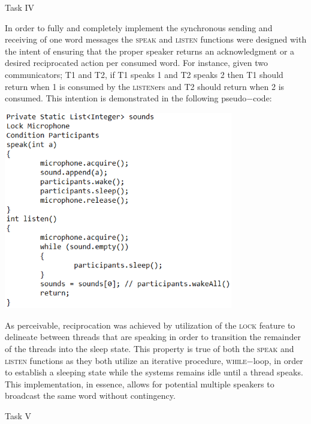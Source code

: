 \documentclass[12pt]{article}
\begin{document}
{\begin{center}Task IV\end{center}
In order to fully and completely implement the synchronous sending and receiving of one word messages the \textsc{speak} and \textsc{listen} functions were designed with the intent of ensuring that the proper speaker returns an acknowledgment or a desired reciprocated action per consumed word. For instance, given two communicators; T\underline{\hspace{.3cm}}1 and T\underline{\hspace{.3cm}}2, if T\underline{\hspace{.3cm}}1 speaks 1 and T\underline{\hspace{.3cm}}2 speaks 2 then T\underline{\hspace{.3cm}}1 should return when 1 is consumed by the \textsc{listen}ers and T\underline{\hspace{.3cm}}2 should return when 2 is consumed. This intention is demonstrated in the following pseudo$-$code: \begin{center} \includegraphics[width=100mm]{pic4.png} \end{center}
As perceivable, reciprocation was achieved by utilization of the \textsc{lock} feature to delineate between threads that are speaking in order to transition the remainder of the threads into the sleep state. This property is true of both the \textsc{speak} and \textsc{listen} functions as they both utilize an iterative procedure, \textsc{while}$-$loop, in order to establish a sleeping state while the systems remains idle until a thread speaks. This implementation, in essence, allows for potential multiple speakers to broadcast the same word without contingency.
\begin{center} Task V\end{center}
}
\end{document}
